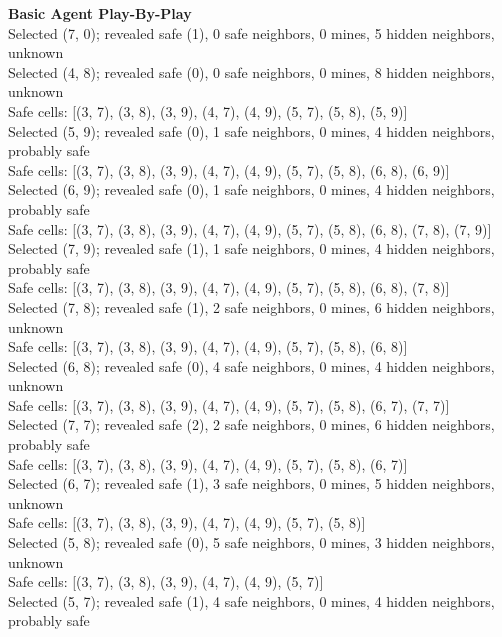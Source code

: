 \documentclass[11pt]{article} %
\begin{document}
\textbf{Basic Agent Play-By-Play}\\
Selected (7, 0); revealed safe (1), 0 safe neighbors, 0 mines, 5 hidden neighbors, unknown\\
Selected (4, 8); revealed safe (0), 0 safe neighbors, 0 mines, 8 hidden neighbors, unknown\\
Safe cells: [(3, 7), (3, 8), (3, 9), (4, 7), (4, 9), (5, 7), (5, 8), (5, 9)]\\
Selected (5, 9); revealed safe (0), 1 safe neighbors, 0 mines, 4 hidden neighbors, probably safe\\
Safe cells: [(3, 7), (3, 8), (3, 9), (4, 7), (4, 9), (5, 7), (5, 8), (6, 8), (6, 9)]\\
Selected (6, 9); revealed safe (0), 1 safe neighbors, 0 mines, 4 hidden neighbors, probably safe\\
Safe cells: [(3, 7), (3, 8), (3, 9), (4, 7), (4, 9), (5, 7), (5, 8), (6, 8), (7, 8), (7, 9)]\\
Selected (7, 9); revealed safe (1), 1 safe neighbors, 0 mines, 4 hidden neighbors, probably safe\\
Safe cells: [(3, 7), (3, 8), (3, 9), (4, 7), (4, 9), (5, 7), (5, 8), (6, 8), (7, 8)]\\
Selected (7, 8); revealed safe (1), 2 safe neighbors, 0 mines, 6 hidden neighbors, unknown\\
Safe cells: [(3, 7), (3, 8), (3, 9), (4, 7), (4, 9), (5, 7), (5, 8), (6, 8)]\\
Selected (6, 8); revealed safe (0), 4 safe neighbors, 0 mines, 4 hidden neighbors, unknown\\
Safe cells: [(3, 7), (3, 8), (3, 9), (4, 7), (4, 9), (5, 7), (5, 8), (6, 7), (7, 7)]\\
Selected (7, 7); revealed safe (2), 2 safe neighbors, 0 mines, 6 hidden neighbors, probably safe\\
Safe cells: [(3, 7), (3, 8), (3, 9), (4, 7), (4, 9), (5, 7), (5, 8), (6, 7)]\\
Selected (6, 7); revealed safe (1), 3 safe neighbors, 0 mines, 5 hidden neighbors, unknown\\
Safe cells: [(3, 7), (3, 8), (3, 9), (4, 7), (4, 9), (5, 7), (5, 8)]\\
Selected (5, 8); revealed safe (0), 5 safe neighbors, 0 mines, 3 hidden neighbors, unknown\\
Safe cells: [(3, 7), (3, 8), (3, 9), (4, 7), (4, 9), (5, 7)]\\
Selected (5, 7); revealed safe (1), 4 safe neighbors, 0 mines, 4 hidden neighbors, probably safe\\
\end{document}
